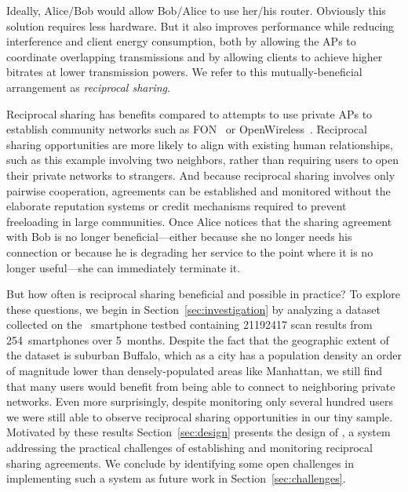 Ideally, Alice/Bob would allow Bob/Alice to use her/his router. Obviously
this solution requires less hardware. But it also improves performance while
reducing interference and client energy consumption, both by allowing the APs
to coordinate overlapping transmissions and by allowing clients to achieve
higher bitrates at lower transmission powers. We refer to this
mutually-beneficial arrangement as \textit{reciprocal \wifi{} sharing}.

Reciprocal \wifi{} sharing has benefits compared to attempts to use private
APs to establish community networks such as FON~\cite{fon} or
OpenWireless~\cite{openwireless}. Reciprocal \wifi{} sharing opportunities
are more likely to align with existing human relationships, such as this
example involving two neighbors, rather than requiring users to open their
private networks to strangers. And because reciprocal \wifi{} sharing
involves only pairwise cooperation, agreements can be established and
monitored without the elaborate reputation systems or credit mechanisms
required to prevent freeloading in large communities. Once Alice notices that
the sharing agreement with Bob is no longer beneficial---either because she
no longer needs his connection or because he is degrading her service to the
point where it is no longer useful---she can immediately terminate it.

But how often is reciprocal \wifi{} sharing beneficial and possible in
practice? To explore these questions, we begin in
Section~\ref{sec:investigation} by analyzing a dataset collected on the
\PhoneLab{}~smartphone testbed containing \num{21192417} \wifi{} scan results
from 254~smartphones over 5~months. Despite the
fact that the geographic extent of the dataset is suburban Buffalo, which as
a city has a population density an order of magnitude lower than
densely-populated areas like Manhattan, we still find that many users would
benefit from being able to connect to neighboring private networks. Even more
surprisingly, despite monitoring only several hundred users we were still
able to observe reciprocal \wifi{} sharing opportunities in our tiny
sample. Motivated by these results Section~\ref{sec:design} presents the
design of \wisefi{}, a system addressing the practical challenges of
establishing and monitoring reciprocal \wifi{} sharing agreements. We
conclude by identifying some open challenges in implementing such a system as
future work in Section~\ref{sec:challenges}.
